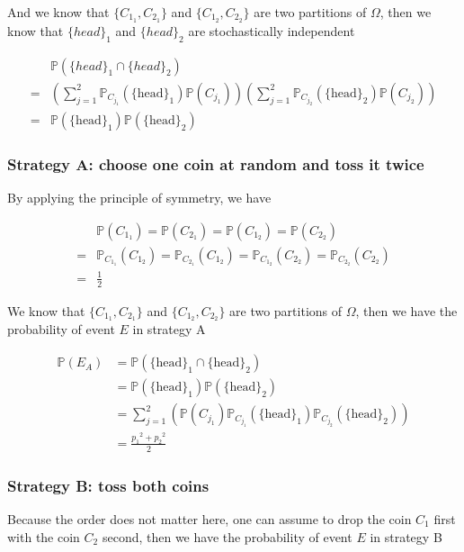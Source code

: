 \documentclass[12pt]{article}
\newcommand{\bP}{\mathbb{P}}
\begin{document}
\begin{enumerate}[label={},leftmargin=0in]
			And we know that $\{C_{1_1},C_{2_1}\}$ and $\{C_{1_2},C_{2_2}\}$ are two partitions of $\Omega$, then we know that $\{head\}_1$ and $\{head\}_2$ are stochastically independent
			
			\[
			\begin{aligned}
				&\bP(\{head\}_1\cap \{head\}_2)\\
				= &\left(\sum_{j=1}^2\bP_{C_{j_1}}(\{\mathrm{head}\}_1)\bP(C_{j_1})\right)\left(\sum_{j=1}^2\bP_{C_{j_2}}(\{\mathrm{head}\}_2)\bP(C_{j_2})\right)\\
				= &\bP(\{\mathrm{head}\}_1)\bP(\{\mathrm{head}\}_2)
			\end{aligned}
			\]
			
			\subsubsection*{Strategy A: choose one coin at random and toss it twice}
			
			By applying the principle of symmetry, we have
			
			\[
			\begin{aligned}
				&\bP(C_{1_1}) = \bP(C_{2_1}) = \bP(C_{1_2}) = \bP(C_{2_2})\\
				= &\bP_{C_{1_1}}(C_{1_2}) = \bP_{C_{2_1}}(C_{1_2}) = \bP_{C_{1_2}}(C_{2_2}) = \bP_{C_{2_2}}(C_{2_2})\\
				= &\frac{1}{2}
			\end{aligned}
			\]
			
			We know that $\{C_{1_1},C_{2_1}\}$ and $\{C_{1_2},C_{2_2}\}$ are two partitions of $\Omega$, then we have the probability of event $E$ in strategy A
			
			\[
			\begin{aligned}
				\bP(E_A) &= \bP(\{\mathrm{head}\}_1\cap \{\mathrm{head}\}_2)\\
				&= \bP(\{\mathrm{head}\}_1)\bP(\{\mathrm{head}\}_2)\\
				&= \sum_{j=1}^2\left(\bP(C_{j_1})\bP_{C_{j_1}}(\{\mathrm{head}\}_1)\bP_{C_{j_2}}(\{\mathrm{head}\}_2)\right)\\
				&= \frac{{p_1}^2 + {p_2}^2}{2}
			\end{aligned}
			\]
			
			\subsubsection*{Strategy B: toss both coins}
			
			Because the order does not matter here, one can assume to drop the coin $C_1$ first with the coin $C_2$ second, then we have the probability of event $E$ in strategy B
			

\end{enumerate}
\end{document}
